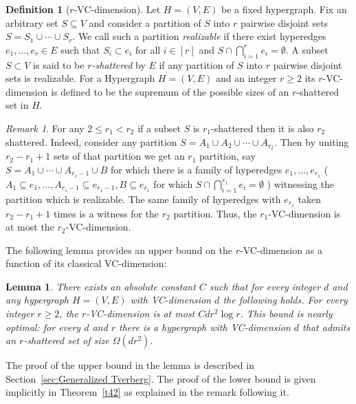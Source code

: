 \documentclass[11pt]{article}
\theoremstyle{plain}
\newtheorem{lemma}[theorem]{Lemma}
\theoremstyle{definition}
\newtheorem{definition}[theorem]{Definition}
\theoremstyle{remark}
\newtheorem{remark}[theorem]{Remark}
\begin{document}
\begin{definition}[$r$-VC-dimension]
\label{defgen}
    Let $H=(V,E)$ be a fixed hypergraph.
    Fix an arbitrary set $S \subseteq V$ and consider a partition of $S$ into $r$ pairwise disjoint sets $S=S_1 \cup \cdots \cup S_r$. We call such a partition {\em realizable} if there exist hyperedges $e_1,\ldots, e_r \in E$ such that $S_i \subset e_i$ for all $i \in [r]$ and $S \cap \bigcap_{i=1}^r e_i = \emptyset$.    
    A subset $S \subset V$ is said
    to be {\em $r$-shattered} by $E$ if any partition of $S$ into $r$
    pairwise disjoint sets is realizable. For a Hypergraph $H=(V,E)$ and an integer $r \geq 2$ its $r$-VC-dimension is defined to be the supremum of the possible sizes of an $r$-shattered set in $H$.
\end{definition}
\begin{remark}
    For any $2 \leq r_1 < r_2$ if a subset $S$ is $r_1$-shattered then it is also $r_2$ shattered. Indeed, consider any partition $S=A_1\cup A_2 \cup  \cdots \cup A_{r_2}$. Then by uniting $r_2-r_1+1$ sets of that partition we get an $r_1$ partition, say $S=A_1 \cup \cdots \cup A_{r_1-1} \cup B$ for which there is a family of hyperedges $e_1,\ldots,e_{r_1}$ ($A_1 \subseteq e_1, \ldots, A_{r_1-1} \subseteq e_{r_1-1}, B \subseteq e_{r_1}$ for which $S \cap \bigcap_{i=1}^{r_1} e_i = \emptyset$ ) witnessing the partition which is realizable. The same family of hyperedges with $e_{r_1}$ taken $r_2-r_1 +1$ times is a witness for the $r_2$ partition. Thus, the $r_1$-VC-dimension is at most the $r_2$-VC-dimension. 
\end{remark}

The following lemma provides an upper bound on the $r$-VC-dimension as a function of its classical VC-dimension: 

\begin{lemma}
\label{lem:generalized-shatter}
There exists an absolute constant $C$ such that for every
integer $d$ and any hypergraph $H=(V,E)$ 
with VC-dimension $d$ the following holds. For
every integer $r \geq 2$, the $r$-VC-dimension is at most $Cdr^2 \log r$. This bound is nearly optimal: for every $d$ and $r$ 
there is a hypergraph with VC-dimension $d$ that admits an $r$-shattered set of size $\Omega(dr^2)$.
\end{lemma}
The proof of the upper bound in the lemma is described in Section~\ref{sec:Generalized Tverberg}.
The proof of the lower bound is given implicitly in Theorem~\ref{t42}
as explained in the remark following it.
\end{document}
